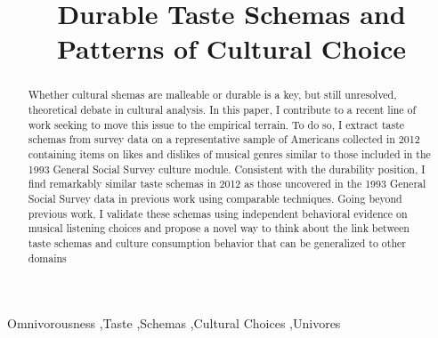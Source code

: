 \documentclass[preprint, authoryear,11pt, 3p]{elsarticle}
\begin{document}
\begin{frontmatter}


\title{Durable Taste Schemas and Patterns of Cultural Choice}






\begin{abstract}
Whether cultural shemas are malleable or durable is a key, but still unresolved, theoretical debate in cultural analysis. In this paper, I contribute to a recent line of work seeking to move this issue to the empirical terrain. To do so, I extract taste schemas from survey data on a representative sample of Americans collected in 2012 containing items on likes and dislikes of musical genres similar to those included in the 1993 General Social Survey culture module. Consistent with the durability position, I find remarkably similar taste schemas in 2012 as those uncovered in the 1993 General Social Survey data in previous work using comparable techniques. Going beyond previous work, I validate these schemas using independent behavioral evidence on musical listening choices and propose a novel way to think about the link between taste schemas and culture consumption behavior that can be generalized to other domains
\end{abstract}

\begin{keyword}
Omnivorousness  \sep Taste \sep Schemas \sep Cultural Choices \sep Univores
\end{keyword}

\end{frontmatter}
\newpage
\end{document}
